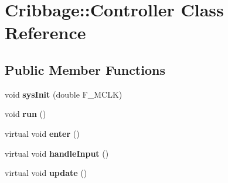\hypertarget{class_cribbage_1_1_controller}{}\section{Cribbage\+:\+:Controller Class Reference}
\label{class_cribbage_1_1_controller}
\subsection*{Public Member Functions}
\begin{DoxyCompactItemize}
\item 
\mbox{\label{class_cribbage_1_1_controller_ad3d6e4a31acbcd046c53824d60cff933}} 
void {\bfseries sys\+Init} (double F\+\_\+\+M\+C\+LK)
\item 
\mbox{\label{class_cribbage_1_1_controller_a6476e6b8fb551d04bdf5a9e28751b5a1}} 
void {\bfseries run} ()
\item 
\mbox{\label{class_cribbage_1_1_controller_a71aa01981985d2e26054db1dc551f7cf}} 
virtual void {\bfseries enter} ()
\item 
\mbox{\label{class_cribbage_1_1_controller_a9235b9fce91b719d9f24176a6fe29b18}} 
virtual void {\bfseries handle\+Input} ()
\item 
\mbox{\label{class_cribbage_1_1_controller_ab465b219f49ab605ea336ec32db2bedc}} 
virtual void {\bfseries update} ()
\end{DoxyCompactItemize}
